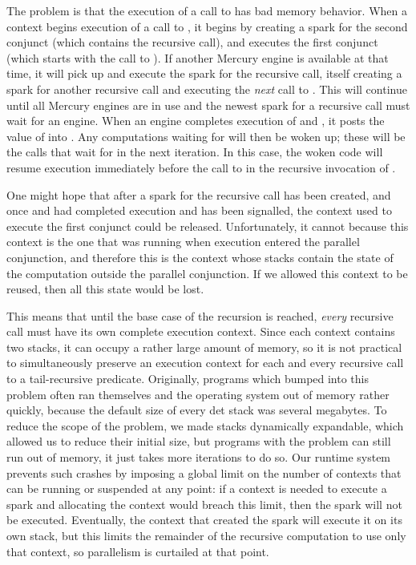 The problem is that the execution of a call to \mapfoldlpar{}
has bad memory behavior.
When a context begins execution of a call to \mapfoldl{},
it begins by creating a spark for the second conjunct
(which contains the recursive call),
and executes the first conjunct (which starts with the call to ).
If another Mercury engine is available at that time,
it will pick up and execute the spark for the recursive call,
itself creating a spark for another recursive call
and executing the \emph{next} call to .
This will continue until all Mercury engines are in use
and the newest spark for a recursive call %
must wait for an %
engine.
When an engine completes execution of  and ,
it posts the value of  into .
Any computations waiting for  will then be woken up;
these will be the calls that wait for  in the next iteration.
In this case, the woken code will resume execution
immediately before the call to 
in the recursive invocation of \mapfoldlpar{}.

One might hope that after a spark for the recursive call has been created,
and once  and  had completed execution
and  has been signalled,
the context used to execute the first conjunct could be released.
Unfortunately, it cannot because this context is the one that was running
when execution entered the parallel conjunction,
and therefore this is the context whose stacks
contain the state of the computation outside the parallel conjunction.
If we allowed this context to be reused,
then all this state would be lost.

This means that until the base case of the recursion is reached,
\emph{every} recursive call must have its own complete execution context.
Since each context contains two stacks,
it can occupy a rather large amount of memory,
so it is not practical to simultaneously preserve an execution context
for each and every recursive call to a tail-recursive predicate.
Originally, programs which bumped into this problem
often ran themselves and the operating system out of memory rather quickly,
because the default size of every det stack was several megabytes.
To reduce the scope of the problem,
we made stacks dynamically expandable,
which allowed us to reduce their initial size,
but programs with the problem can still run out of memory,
it just takes more iterations to do so.
\label{sec:context_limit}
Our runtime system prevents such crashes
by imposing a global limit on the number of contexts
that can be running or suspended at any point:
if a context is needed to execute a spark
and allocating the context would breach this limit,
then the spark will not be executed.
Eventually, the context that created the spark will execute it on its
own stack, but this limits the remainder of the recursive computation
to use only that context, so parallelism is curtailed at that point.

